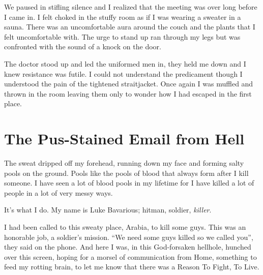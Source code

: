We paused in stifling silence and I realized that the meeting was
over long before I came in. I felt choked in the stuffy room as if
I was wearing a sweater in a sauna. There was an uncomfortable aura
around the couch and the plants that I felt uncomfortable with. The
urge to stand up ran through my legs but was confronted with the
sound of a knock on the door.



The doctor stood up and led the uniformed men in, they held me down
and I knew resistance was futile. I could not understand the
predicament though I understood the pain of the tightened
straitjacket. Once again I was muffled and thrown in the room
leaving them only to wonder how I had escaped in the first place. 

 



%
%
%
%
%
%
% 
%
%
%
%
%
%
%
%
% 
%
%


\chapter{ The Pus-Stained Email from Hell}


The sweat dripped off my forehead, running down my face and forming
salty pools on the ground. Pools like the pools of blood that
always form after I kill someone. I have seen a lot of blood pools
in my lifetime for I have killed a lot of people in a lot of very
messy ways.



It's what I do. My name is Luke Bavarious; hitman, soldier,
{\em killer}.



I had been called to this sweaty place, Arabia, to kill some guys.
This was an honorable job, a soldier's mission. ``We need some guys
killed so we called you'', they said on the phone. And here I was,
in this God-forsaken hellhole, hunched over this screen, hoping for
a morsel of communication from Home, something to feed my rotting
brain, to let me know that there was a Reason To Fight, To
Live.



